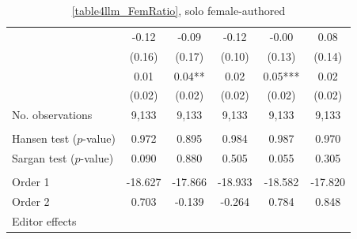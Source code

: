 \begin{table}
    \footnotesize
    \centering
    \begin{threeparttable}
        \caption{\autoref{table4llm_FemRatio}, solo female-authored}
        \label{table4llm_FemSolo}
        \begin{tabular}{p{3cm}S@{}S@{}S@{}S@{}S@{}}
            \toprule
            &{}&{}&{}&{}&{}\\
            \midrule
            &       -0.12   &       -0.09   &       -0.12   &       -0.00   &        0.08   \\
                                          &      (0.16)   &      (0.17)   &      (0.10)   &      (0.13)   &      (0.14)   \\
            &        0.01   &        0.04** &        0.02   &        0.05***&        0.02   \\
                                          &      (0.02)   &      (0.02)   &      (0.02)   &      (0.02)   &      (0.02)   \\
            \midrule
            No. observations      &       9,133   &       9,133   &       9,133   &       9,133   &       9,133   \\
             \\\quad Hansen test (\(p\)-value)&       0.972   &       0.895   &       0.984   &       0.987   &       0.970   \\
            \quad Sargan test (\(p\)-value)&       0.090   &       0.880   &       0.505   &       0.055   &       0.305   \\
             \\\quad Order 1&     -18.627   &     -17.866   &     -18.933   &     -18.582   &     -17.820   \\
            \quad Order 2                 &       0.703   &      -0.139   &      -0.264   &       0.784   &       0.848   \\
            \midrule
            Editor effects        &           {}   &           {}   &           {}   &           {}   &           {}   \\

\end{tabular}
\end{threeparttable}
\end{table}
